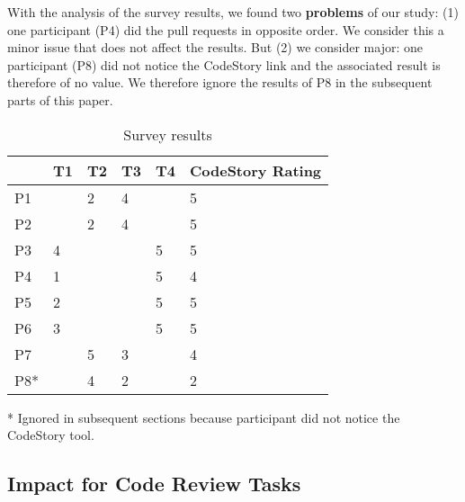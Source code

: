 \documentclass[../manifest.tex]{subfiles}
\begin{document}
With the analysis of the survey results, we found two \textbf{problems} of our study: (1) one participant (P4) did the pull requests in opposite order. We consider this a minor issue that does not affect the results. But (2) we consider major: one participant (P8) did not notice the CodeStory link and the associated result is therefore of no value. We therefore ignore the results of P8 in the subsequent parts of this paper.

\begin{table*}[t]
    \centering
    \begin{threeparttable}
    \begin{tabular*}{\textwidth}{llllll}
    \hline
    \textbf{} & \textbf{T1} & \textbf{T2} & \textbf{T3} & \textbf{T4} & \textbf{CodeStory Rating} \\
    \hline
    P1  &   & 2 & 4 &   & 5 \\
    P2  &   & 2 & 4 &   & 5 \\
    P3  & 4 &   &   & 5 & 5 \\
    P4  & 1 &   &   & 5 & 4 \\
    P5  & 2 &   &   & 5 & 5 \\
    P6  & 3 &   &   & 5 & 5 \\
    P7  &   & 5 & 3 &   & 4 \\
    P8* &   & 4 & 2 &   & 2 \\
    \hline
    \end{tabular*}
    \begin{tablenotes}\footnotesize
      \item [*] Ignored in subsequent sections because participant did not notice the CodeStory tool.
    \end{tablenotes}
    \end{threeparttable}
    \caption{Survey results}
    \label{tab:survey-results}
\end{table*}

\subsection{Impact for Code Review Tasks} \label{eval-impact}
\end{document}
